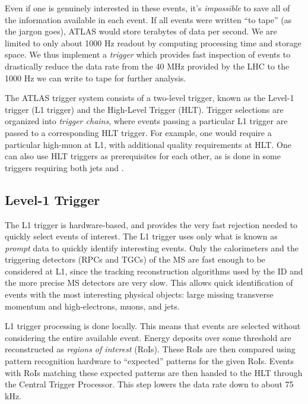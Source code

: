 Even if one is genuinely interested in these events, it's \textit{impossible} to save all of the information available in each event.
If all events were written ``to tape'' (as the jargon goes), ATLAS would store terabytes of data per second.
We are limited to only about 1000 Hz readout by computing processing time and storage space.
We thus implement a \textit{trigger} which provides fast inspection of events to drastically reduce the data rate from the 40 MHz provided by the LHC to the 1000 Hz we can write to tape for further analysis.

The ATLAS trigger system consists of a two-level trigger, known as the Level-1 trigger (L1 trigger) and the High-Level Trigger (HLT)\footnotemark.
Trigger selections are organized into \textit{trigger chains}, where events passing a particular L1 trigger are passed to a corresponding HLT trigger.
For example, one would require a particular high-\pt muon at L1, with additional quality requirements at HLT.
One can also use HLT triggers as prerequisites for each other, as is done in some triggers requiring both jets and \met.

\subsection{Level-1 Trigger}

The L1 trigger is hardware-based, and provides the very fast rejection needed to quickly select events of interest.
The L1 trigger uses only what is known as \textit{prompt} data to quickly identify interesting events.
Only the calorimeters and the triggering detectors (RPCs and TGCs)  of the MS are fast enough to be considered at L1, since the tracking reconstruction algorithms used by the ID and the more precise MS detectors are very slow.
This allows quick identification of events with the most interesting physical objects: large missing transverse momentum and high-\pt electrons, muons, and jets.

L1 trigger processing is done locally.
This means that events are selected without considering the entire available event.
Energy deposits over some threshold are reconstructed as \textit{regions of interest} (RoIs).
These RoIs are then compared using pattern recognition hardware to ``expected'' patterns for the given RoIs.
Events with RoIs matching these expected patterns are then handed to the HLT through the Central Trigger Processor.
This step lowers the data rate down to about 75 kHz.

